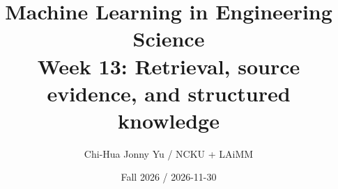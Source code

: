 \documentclass[11pt,oneside]{book}
\begin{document}
\title{Machine Learning in Engineering Science\\\large Week 13: Retrieval, source evidence, and structured knowledge}\author{Chi-Hua Jonny Yu / NCKU + LAiMM}\date{Fall 2026 / 2026-11-30}\maketitle

\end{document}

